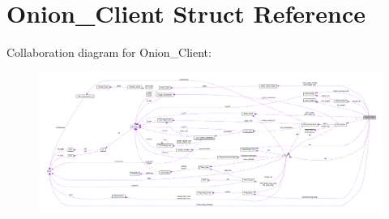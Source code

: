 \hypertarget{struct_onion___client}{\section{Onion\+\_\+\+Client Struct Reference}
\label{struct_onion___client}
}


Collaboration diagram for Onion\+\_\+\+Client\+:\nopagebreak
\begin{figure}[H]
\begin{center}
\leavevmode
\includegraphics[width=350pt]{struct_onion___client__coll__graph}
\end{center}
\end{figure}
